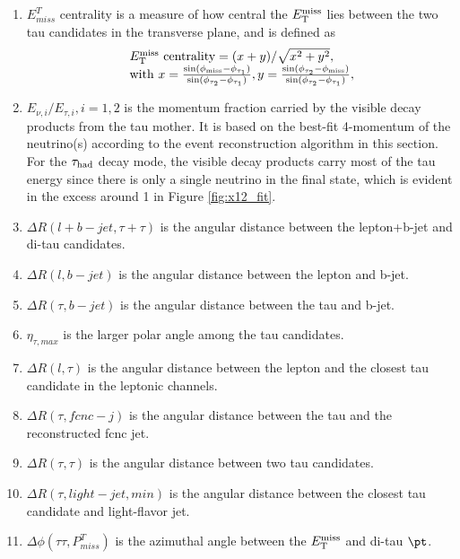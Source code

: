 \begin{enumerate}
\item $E^{T}_{miss}$ centrality is a measure of how central the $E_{\text{T}}^{\text{miss}}$ lies between the two tau candidates in the transverse plane, and is defined as
\begin{eqnarray}
\begin{array}{l}
E_{\text{T}}^{\text{miss}}~\text{centrality} = {(x+y)}/{\sqrt{x^2+y^2}}, \\
\text{with}~x=\frac{\sin(\phi_{\text{miss}}-\phi_{\tau_1})}{\sin(\phi_{\tau_2}-\phi_{\tau_1})},  y=\frac{\sin(\phi_{\tau_2}-\phi_{\text{miss}})}{\sin(\phi_{\tau_2}-\phi_{\tau_1})} ,
\end{array}
\label{eq:eq3}
\end{eqnarray}
\item $E_{\nu,i}/E_{\tau,i},i=1,2$ is the momentum fraction carried by the visible decay products from the tau mother. It is based on the best-fit 4-momentum of the neutrino(s) according to the event reconstruction algorithm in this section. For the $\tau_\text{had}$ decay mode, the visible decay products carry most of the tau energy since there is only a single neutrino in the final state, which is evident in the excess around 1 in Figure \ref{fig:x12_fit}. 
\item $\Delta R(l+b-jet,\tau+\tau)$ is the angular distance between the lepton+b-jet and di-tau candidates.
\item $\Delta R(l,b-jet)$ is the angular distance between the lepton and b-jet.
\item $\Delta R(\tau,b-jet)$ is the angular distance between the tau and b-jet.
\item $\eta_{\tau,max}$ is the larger polar angle among the tau candidates.
\item $\Delta R(l,\tau)$ is the angular distance between the lepton and the closest tau candidate in the leptonic channels.
\item $\Delta R(\tau,fcnc-j)$ is the angular distance between the tau and the reconstructed fcnc jet.
\item $\Delta R(\tau,\tau)$ is the angular distance between two tau candidates.
\item $\Delta R(\tau,light-jet,min)$ is the angular distance between the closest tau candidate and light-flavor jet.
\item $\Delta\phi(\tau\tau,P^{T}_{miss})$ is the azimuthal angle between the $E_{\text{T}}^{\text{miss}}$ and di-tau $\pt$.

\end{enumerate}
